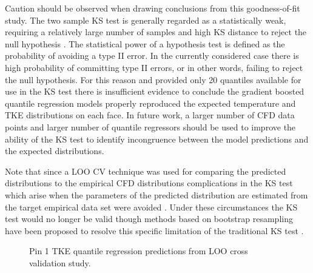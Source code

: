Caution should be observed when drawing conclusions from this goodness-of-fit study.
The two sample KS test is generally regarded as a statistically weak, requiring a relatively large number of samples and high KS distance to reject the null hypothesis \cite{ks_power} \cite{KHAMIS1990317}.  The statistical power of a hypothesis test is defined as the probability of avoiding a type II error.  In the currently considered case there is high probability of committing type II errors, or in other words, failing to reject the null hypothesis.  For this reason and provided only 20 quantiles available for use in the KS test there is insufficient evidence to conclude the gradient boosted quantile regression models properly reproduced the expected temperature and TKE distributions on each face.  In future work, a larger number of CFD data points and larger number of quantile regressors should be used to improve the ability of the KS test to identify incongruence between the model predictions and the expected distributions.

Note that since a LOO CV technique was used for comparing the predicted distributions to the empirical CFD distributions complications in the KS test which arise when the parameters of the predicted distribution are estimated from the target empirical data set were avoided \cite{kstestInfo}.   Under these circumstances the KS test would no longer be valid though methods based on bootstrap resampling have been proposed to resolve this specific limitation of the traditional KS test \cite{kstestInfo}.

\begin{figure}[H]%
    \captionsetup[subfigure]{justification=centering}
    \centering
    \hspace*{-1.0em}%
    \caption[Q-Q LOO TKE pin 1 results.]{Pin 1 TKE quantile regression predictions from LOO cross validation study.}%
    \label{fig:tkepin1}%
\end{figure}


